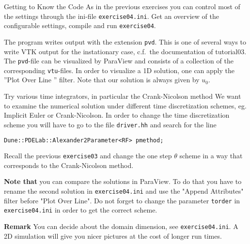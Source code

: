 \documentclass[12pt,a4paper]{article}
\begin{document}
\begin{Exercise}{Getting to Know the Code}
  As in the previous exercises you can control most of the settings
  through the ini-file \lstinline!exercise04.ini!. Get an overview of
  the configurable settings, compile and run \lstinline!exercise04!.

  The program writes output with the extension \lstinline!pvd!. This
  is one of several ways to write VTK output for the instationary
  case, c.f.~the documentation of tutorial03. The \lstinline!pvd!-file
  can be visualized by ParaView and consists of a collection of the
  corresponding \lstinline!vtu!-files. In order to visualize a 1D
  solution, one can apply the ''Plot Over Line '' filter. Note that
  our solution is always given by $u_0$.
\end{Exercise}

\begin{Exercise}{Try various time integrators, in particular the Crank-Nicolson method}
  We want to examine the numerical solution under different time
  discretization schemes, eg. Implicit Euler or Crank-Nicolson. In
  order to change the time discretization scheme you will have to go
  to the file \lstinline!driver.hh! and search for the line
  \begin{lstlisting}
Dune::PDELab::Alexander2Parameter<RF> pmethod;
  \end{lstlisting}

  Recall the previous \lstinline!exercise03! and change the one step
  $\theta$ scheme in a way that corresponds to the Crank-Nicolson
  method.

  \textbf{Note that} you can compare the solutions in ParaView. To do
  that you have to rename the second solution in
  \lstinline!exercise04.ini! and use the "Append Attributes" filter
  before "Plot Over Line". Do not forget to change the parameter
  \lstinline!torder! in \lstinline!exercise04.ini! in order to get the
  correct scheme.
\end{Exercise}


\textbf{Remark} You can decide about the domain dimension, see
\lstinline!exercise04.ini!. A 2D simulation will give you nicer
pictures at the cost of longer run times.
\end{document}
